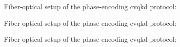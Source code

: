 
\begin{figure}[htb]
	\centering
	
	\caption{Fiber-optical setup of the phase-encoding \gls{cvqkd} protocol:}
\end{figure}

\begin{figure}[htb]
	\centering
	
	\caption{Fiber-optical setup of the phase-encoding \gls{cvqkd} protocol:}
\end{figure}

\begin{figure}[htb]
	\centering
	
	\caption{Fiber-optical setup of the phase-encoding \gls{cvqkd} protocol:}
\end{figure}


